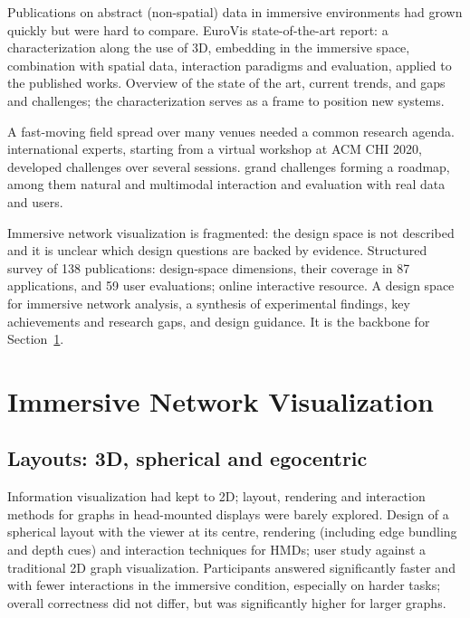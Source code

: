 \documentclass[11pt,a4paper]{article}
\begin{document}
\prob Publications on abstract (non-spatial) data in immersive environments had grown
quickly but were hard to compare.
\meth EuroVis state-of-the-art report: a characterization along the use of 3D, embedding
in the immersive space, combination with spatial data, interaction paradigms and
evaluation, applied to the published works.
\res Overview of the state of the art, current trends, and gaps and challenges; the
characterization serves as a frame to position new systems.

\prob A fast-moving field spread over many venues needed a common research agenda.
 international experts, starting from a virtual workshop at ACM CHI 2020, developed
challenges over several sessions.
 grand challenges forming a roadmap, among them natural and multimodal interaction
and evaluation with real data and users.

\prob Immersive network visualization is fragmented: the design space is not described
and it is unclear which design questions are backed by evidence.
\meth Structured survey of 138 publications: design-space dimensions, their coverage in 87
applications, and 59 user evaluations; online interactive resource.
\res A design space for immersive network analysis, a synthesis of experimental findings,
key achievements and research gaps, and design guidance. It is the backbone for
Section~\ref{sec:networks}.

\section{Immersive Network Visualization}
\label{sec:networks}

\subsection{Layouts: 3D, spherical and egocentric}

\prob Information visualization had kept to 2D; layout, rendering and interaction methods
for graphs in head-mounted displays were barely explored.
\meth Design of a spherical layout with the viewer at its centre, rendering (including edge
bundling and depth cues) and interaction techniques for HMDs; user study against a
traditional 2D graph visualization.
\res Participants answered significantly faster and with fewer interactions in the
immersive condition, especially on harder tasks; overall correctness did not differ, but
was significantly higher for larger graphs.
\end{document}

